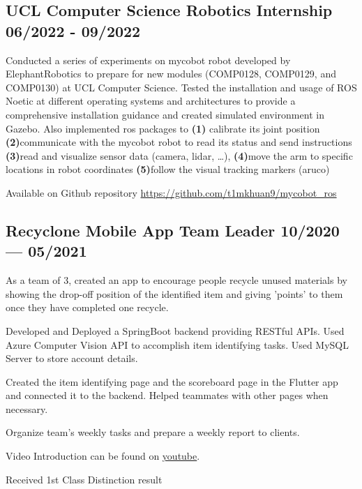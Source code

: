 \subsection*{{
    UCL Computer Science Robotics Internship
    \hfill 06/2022 - 09/2022
}}
\begin{zitemize}
    \item   Conducted a series of experiments on mycobot robot developed by ElephantRobotics 
            to prepare for new modules (COMP0128, COMP0129, and COMP0130) at UCL Computer Science. 
            Tested the installation and usage of ROS Noetic at different operating systems and architectures to provide a comprehensive installation guidance and 
            created simulated environment in Gazebo. 
            Also implemented ros packages to 
            \textbf{(1)} calibrate its joint position
            \textbf{(2)}communicate with the mycobot robot to read its status and send instructions
            \textbf{(3)}read and visualize sensor data (camera, lidar, …),
            \textbf{(4)}move the arm to specific locations in robot coordinates
            \textbf{(5)}follow the visual tracking markers (aruco)
    \item   Available on Github repository 
            \url{https://github.com/t1mkhuan9/mycobot_ros}
\end{zitemize}


\subsection{{
    Recyclone Mobile App Team Leader
    \hfill 10/2020 --- 05/2021
}}
\begin{zitemize}
    \item   As a team of 3, created an app to encourage people recycle unused materials by showing
            the drop-off position of the identified item and giving 'points' to them
            once they have completed one recycle. 
    \item   Developed and Deployed a SpringBoot backend providing RESTful APIs.
            Used Azure Computer Vision API to accomplish item identifying tasks.
            Used MySQL Server to store account details. 
    \item   Created the item identifying page and the scoreboard page in the Flutter app and connected it
            to the backend. Helped teammates with other pages when necessary. 
    \item   Organize team's weekly tasks and prepare a weekly report to clients. 
    \item   Video Introduction can be found on \href{https://www.youtube.com/watch?v=gh0Uv4mf7cA&t=3s&ab_channel=timkhuang}{youtube}.
    \item   Received 1st Class Distinction result
\end{zitemize}



